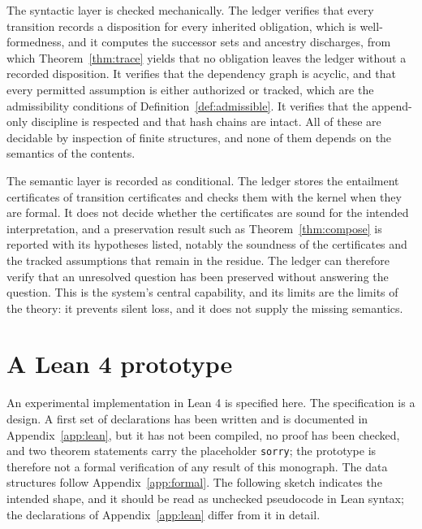 The syntactic layer is checked mechanically. The ledger verifies that every transition records a disposition for every inherited obligation, which is well-formedness, and it computes the successor sets and ancestry discharges, from which Theorem~\ref{thm:trace} yields that no obligation leaves the ledger without a recorded disposition. It verifies that the dependency graph is acyclic, and that every permitted assumption is either authorized or tracked, which are the admissibility conditions of Definition~\ref{def:admissible}. It verifies that the append-only discipline is respected and that hash chains are intact. All of these are decidable by inspection of finite structures, and none of them depends on the semantics of the contents.

The semantic layer is recorded as conditional. The ledger stores the entailment certificates of transition certificates and checks them with the kernel when they are formal. It does not decide whether the certificates are sound for the intended interpretation, and a preservation result such as Theorem~\ref{thm:compose} is reported with its hypotheses listed, notably the soundness of the certificates and the tracked assumptions that remain in the residue. The ledger can therefore verify that an unresolved question has been preserved without answering the question. This is the system's central capability, and its limits are the limits of the theory: it prevents silent loss, and it does not supply the missing semantics.

\section{A Lean 4 prototype}
\label{sec:leanproto}

An experimental implementation in Lean 4 is specified here. The specification is a design. A first set of declarations has been written and is documented in Appendix~\ref{app:lean}, but it has not been compiled, no proof has been checked, and two theorem statements carry the placeholder \texttt{sorry}; the prototype is therefore not a formal verification of any result of this monograph. The data structures follow Appendix~\ref{app:formal}. The following sketch indicates the intended shape, and it should be read as unchecked pseudocode in Lean syntax; the declarations of Appendix~\ref{app:lean} differ from it in detail.

